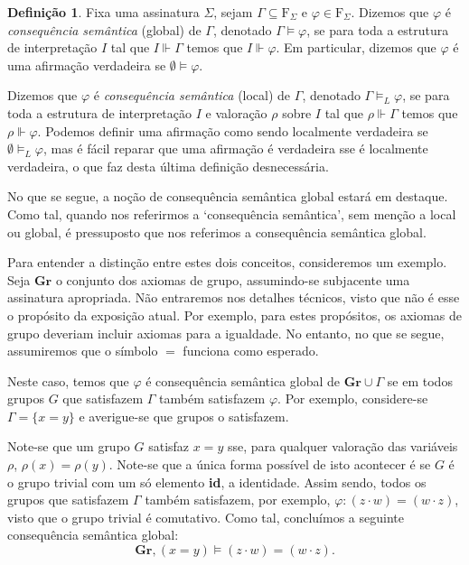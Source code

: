 \documentclass{report}
\theoremstyle{definition}
\newtheorem{definicao}{Definição}
\theoremstyle{remark}
\newcommand{\F}{\mathrm{F}}
\begin{document}
	\begin{definicao}
	Fixa uma assinatura $\Sigma$, sejam $\Gamma \subseteq \F_\Sigma$ e $\varphi \in \F_\Sigma$. Dizemos que $\varphi$ é \emph{consequência semântica} (global) de $\Gamma$, denotado $\Gamma \vDash \varphi$, se para toda a estrutura de interpretação $I$ tal que $I \Vdash \Gamma$ temos que $I \Vdash \varphi$. Em particular, dizemos que $\varphi$ é uma afirmação verdadeira se $\emptyset \vDash \varphi$.
	
	Dizemos que $\varphi$ é \emph{consequência semântica} (local) de $\Gamma$, denotado $\Gamma \vDash_L \varphi$, se para toda a estrutura de interpretação $I$ e valoração $\rho$ sobre $I$ tal que $\rho \Vdash \Gamma$ temos que $\rho \Vdash \varphi$. Podemos definir uma afirmação como sendo localmente verdadeira se $\emptyset \vDash_L \varphi$, mas é fácil reparar que uma afirmação é verdadeira sse é localmente verdadeira, o que faz desta última definição desnecessária.
	\end{definicao}
	
	No que se segue, a noção de consequência semântica global estará em destaque. Como tal, quando nos referirmos a `consequência semântica', sem menção a local ou global, é pressuposto que nos referimos a consequência semântica global.
	
	Para entender a distinção entre estes dois conceitos, consideremos um exemplo. Seja $\mathbf{Gr}$ o conjunto dos axiomas de grupo, assumindo-se subjacente uma assinatura apropriada. Não entraremos nos detalhes técnicos, visto que não é esse o propósito da exposição atual. Por exemplo, para estes propósitos, os axiomas de grupo deveriam incluir axiomas para a igualdade. No entanto, no que se segue, assumiremos que o símbolo $=$ funciona como esperado.
	
	Neste caso, temos que $\varphi$ é consequência semântica global de $\mathbf{Gr} \cup \Gamma$ se em todos grupos $G$ que satisfazem $\Gamma$ também satisfazem $\varphi$. Por exemplo, considere-se $\Gamma = \{x = y\}$ e averigue-se que grupos o satisfazem.
	
	Note-se que um grupo $G$ satisfaz $x = y$ sse, para qualquer valoração das variáveis $\rho$, $\rho(x) = \rho(y)$. Note-se que a única forma possível de isto acontecer é se $G$ é o grupo trivial com um só elemento \textbf{id}, a identidade. Assim sendo, todos os grupos que satisfazem $\Gamma$ também satisfazem, por exemplo, $\varphi : (z \cdot w) = (w \cdot z)$, visto que o grupo trivial é comutativo. Como tal, concluímos a seguinte consequência semântica global:
	\[\mathbf{Gr}, (x = y) \vDash (z \cdot w) = (w \cdot z).\]
	
\end{document}
